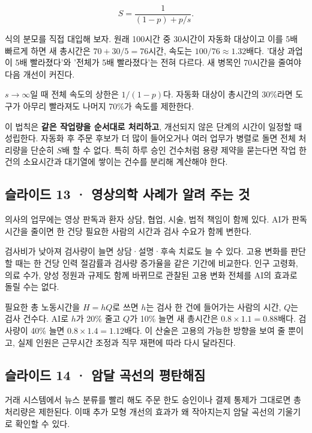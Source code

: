 \documentclass[11pt,a4paper]{article}
\begin{document}
\[
S=\frac{1}{(1-p)+p/s}.
\]

식의 분모를 직접 대입해 보자. 원래 100시간 중 30시간이 자동화 대상이고 이를 5배 빠르게 하면 새 총시간은 $70+30/5=76$시간, 속도는 $100/76\approx1.32$배다. '대상 과업이 5배 빨라졌다'와 '전체가 5배 빨라졌다'는 전혀 다르다. 새 병목인 70시간을 줄여야 다음 개선이 커진다.\par

$s\to\infty$일 때 전체 속도의 상한은 $1/(1-p)$다. 자동화 대상이 총시간의 30\%라면 도구가 아무리 빨라져도 나머지 70\%가 속도를 제한한다.\par

이 법칙은 \textbf{같은 작업량을 순서대로 처리하고}, 개선되지 않은 단계의 시간이 일정할 때 성립한다. 자동화 후 주문 후보가 더 많이 들어오거나 여러 업무가 병렬로 돌면 전체 처리량을 단순히 $S$배 할 수 없다. 특히 하루 승인 건수처럼 용량 제약을 묻는다면 작업 한 건의 소요시간과 대기열에 쌓이는 건수를 분리해 계산해야 한다.\par

\subsection{슬라이드 13 · 영상의학 사례가 알려 주는 것}
의사의 업무에는 영상 판독과 환자 상담, 협업, 시술, 법적 책임이 함께 있다. AI가 판독 시간을 줄이면 한 건당 필요한 사람의 시간과 검사 수요가 함께 변한다.\par

검사비가 낮아져 검사량이 늘면 상담·설명·후속 치료도 늘 수 있다. 고용 변화를 판단할 때는 한 건당 인력 절감률과 검사량 증가율을 같은 기간에 비교한다. 인구 고령화, 의료 수가, 양성 정원과 규제도 함께 바뀌므로 관찰된 고용 변화 전체를 AI의 효과로 돌릴 수는 없다.\par

필요한 총 노동시간을 $H=hQ$로 쓰면 $h$는 검사 한 건에 들어가는 사람의 시간, $Q$는 검사 건수다. AI로 $h$가 20\% 줄고 $Q$가 10\% 늘면 새 총시간은 $0.8\times1.1=0.88$배다. 검사량이 40\% 늘면 $0.8\times1.4=1.12$배다. 이 산술은 고용의 가능한 방향을 보여 줄 뿐이고, 실제 인원은 근무시간 조정과 직무 재편에 따라 다시 달라진다.\par

\subsection{슬라이드 14 · 암달 곡선의 평탄해짐}
거래 시스템에서 뉴스 분류를 빨리 해도 주문 한도 승인이나 결제 통제가 그대로면 총 처리량은 제한된다. 이때 추가 모형 개선의 효과가 왜 작아지는지 암달 곡선의 기울기로 확인할 수 있다.\par
\end{document}
